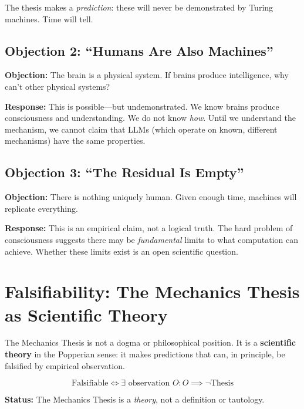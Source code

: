 The thesis makes a \textit{prediction}: these will never be demonstrated by Turing machines. Time will tell.


\subsection{Objection 2: ``Humans Are Also Machines''}

\textbf{Objection:} The brain is a physical system. If brains produce intelligence, why can't other physical systems?

\textbf{Response:} This is possible---but undemonstrated. We know brains produce consciousness and understanding. We do not know \textit{how}. Until we understand the mechanism, we cannot claim that LLMs (which operate on known, different mechanisms) have the same properties.


\subsection{Objection 3: ``The Residual Is Empty''}

\textbf{Objection:} There is nothing uniquely human. Given enough time, machines will replicate everything.

\textbf{Response:} This is an empirical claim, not a logical truth. The hard problem of consciousness suggests there may be \textit{fundamental} limits to what computation can achieve. Whether these limits exist is an open scientific question.


\section{Falsifiability: The Mechanics Thesis as Scientific Theory}
\label{sec:hi-falsifiability}

\begin{tcolorbox}[colback=blue!10!white, colframe=blue!75!black,
    title=\textbf{The Mechanics Thesis Is Falsifiable}]

The Mechanics Thesis is not a dogma or philosophical position. It is a \textbf{scientific theory} in the Popperian sense: it makes predictions that can, in principle, be falsified by empirical observation.

\begin{equation}
\text{Falsifiable} \iff \exists \text{ observation } O : O \implies \neg \text{Thesis}
\end{equation}

\textbf{Status:} The Mechanics Thesis is a \textit{theory}, not a definition or tautology.
\end{tcolorbox}

